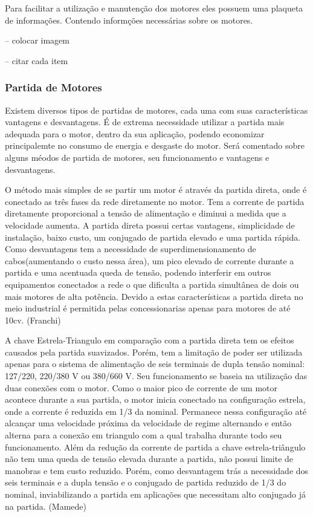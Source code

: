 
Para facilitar a utilização e manutenção dos motores eles possuem uma plaqueta de informações. Contendo informções necessárias sobre os motores. 

-- colocar imagem 

-- citar cada item




\subsubsection{Partida de Motores}

Existem diversos tipos de partidas de motores, cada uma com suas características vantagens e desvantagens. É de extrema necessidade utilizar a partida mais adequada para o motor, dentro da sua aplicação, podendo economizar principalemte no consumo de energia e desgaste do motor. Será comentado sobre alguns méodos de partida de motores, seu funcionamento e vantagens e desvantagens.


O método mais simples de se partir um motor é através da partida direta, onde é conectado as três fases da rede diretamente no motor. Tem a corrente de partida diretamente proporcional a tensão de alimentação e diminui a medida que a velocidade aumenta. 
A partida direta possui certas vantagens, simplicidade de instalação, baixo custo, um conjugado de partida elevado e uma partida rápida. Como desvantagens tem a necessidade de superdimensionamento de cabos(aumentando o custo nessa área), um pico elevado de corrente durante a partida e uma acentuada queda de tensão, podendo interferir em outros equipamentos conectados a rede o que dificulta a partida simultânea de dois ou mais motores de alta potência. Devido a estas características a partida direta no meio industrial é permitida pelas concessionarias apenas para motores de até 10cv. (Franchi)  %

A chave Estrela-Triangulo em comparação com a partida direta tem os efeitos causados pela partida suavizados. Porém, tem a limitação de poder ser utilizada apenas para o sistema de alimentação de seis terminais de dupla tensão nominal: 127/220, 220/380 V ou 380/660 V.
Seu funcionamento se baseia na utilização das duas conexões com o motor. Como o maior pico de corrente de um motor acontece durante a sua partida, o motor inicia conectado na configuração estrela, onde a corrente é reduzida em 1/3 da nominal. Permanece nessa configuração até alcançar uma velocidade próxima da velocidade de regime alternando e então alterna para a conexão em triangulo com a qual trabalha durante todo seu funcionamento.
Além da redução da corrente de partida a chave estrela-triângulo não tem uma queda de tensão elevada durante a partida, não possui limite de manobras e tem custo reduzido. Porém, como desvantagem trás a necessidade dos seis terminais e a dupla tensão e o conjugado de partida reduzido de 1/3 do nominal, inviabilizando a partida em aplicações que necessitam alto conjugado já na partida. (Mamede) %


